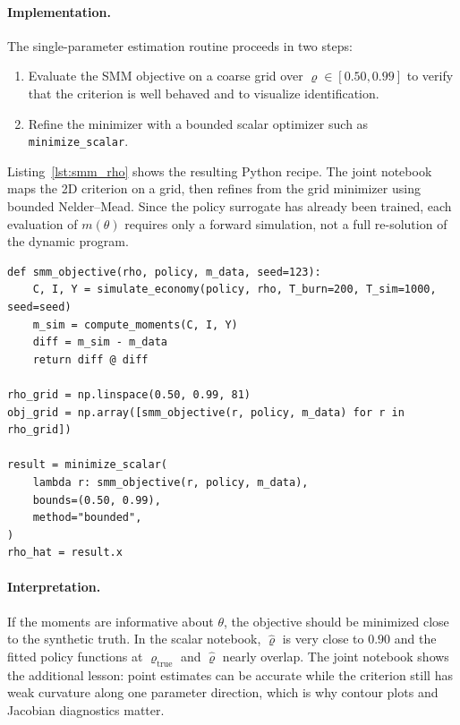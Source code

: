 \documentclass[11pt,a4paper]{report}
\begin{document}
\paragraph{Implementation.}
The single-parameter estimation routine proceeds in two steps:
\begin{enumerate}[itemsep=3pt]
\item Evaluate the SMM objective on a coarse grid over $\varrho \in [0.50,0.99]$ to verify that the criterion is well behaved and to visualize identification.
\item Refine the minimizer with a bounded scalar optimizer such as \texttt{minimize\_scalar}.
\end{enumerate}
Listing~\ref{lst:smm_rho} shows the resulting Python recipe.  The joint notebook maps the 2D criterion on a grid, then refines from the grid minimizer using bounded Nelder--Mead.  Since the policy surrogate has already been trained, each evaluation of $m(\theta)$ requires only a forward simulation, not a full re-solution of the dynamic program.

\begin{lstlisting}[caption={Direct SMM estimation of TFP persistence in the Brock--Mirman exercise.},label={lst:smm_rho}]
def smm_objective(rho, policy, m_data, seed=123):
    C, I, Y = simulate_economy(policy, rho, T_burn=200, T_sim=1000, seed=seed)
    m_sim = compute_moments(C, I, Y)
    diff = m_sim - m_data
    return diff @ diff

rho_grid = np.linspace(0.50, 0.99, 81)
obj_grid = np.array([smm_objective(r, policy, m_data) for r in rho_grid])

result = minimize_scalar(
    lambda r: smm_objective(r, policy, m_data),
    bounds=(0.50, 0.99),
    method="bounded",
)
rho_hat = result.x
\end{lstlisting}

\paragraph{Interpretation.}
If the moments are informative about $\theta$, the objective should be minimized close to the synthetic truth.  In the scalar notebook, $\hat\varrho$ is very close to $0.90$ and the fitted policy functions at $\varrho_{\mathrm{true}}$ and $\hat\varrho$ nearly overlap.  The joint notebook shows the additional lesson: point estimates can be accurate while the criterion still has weak curvature along one parameter direction, which is why contour plots and Jacobian diagnostics matter.
\end{document}
